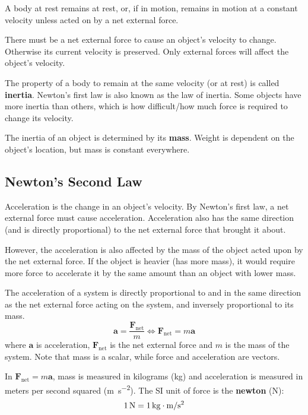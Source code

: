 \documentclass{article}
\newcommand{\theorem}[2]{\begin{tcolorbox}[title={#1},colback=blue!5!white,colframe=blue!75!black,parbox=false] #2 \end{tcolorbox}}
\begin{document}
\theorem{Newton's first law}{A body at rest remains at rest, or, if in motion, remains in motion at a constant velocity unless acted on by a net external force.}

There must be a net external force to cause an object's velocity to change. Otherwise its current velocity is preserved. Only external forces will affect the object's velocity.

The property of a body to remain at the same velocity (or at rest) is called \textbf{inertia}. Newton's first law is also known as the law of inertia. Some objects have more inertia than others, which is how difficult/how much force is required to change its velocity.

The inertia of an object is determined by its \textbf{mass}. Weight is dependent on the object's location, but mass is constant everywhere.

\subsection{Newton's Second Law}

Acceleration is the change in an object's velocity. By Newton's first law, a net external force must cause acceleration. Acceleration also has the same direction (and is directly proportional) to the net external force that brought it about.

However, the acceleration is also affected by the mass of the object acted upon by the net external force. If the object is heavier (has more mass), it would require more force to accelerate it by the same amount than an object with lower mass.

\theorem{Newton's second law}{The acceleration of a system is directly proportional to and in the same direction as the net external force acting on the system, and inversely proportional to its mass.
\begin{equation*}
	\mathbf{a}=\frac{\mathbf{F}_{\text{net}}}{m}
	\iff
	\mathbf{F}_{\text{net}}=m \mathbf{a}
\end{equation*}
where $\mathbf{a}$ is acceleration, $\mathbf{F}_{\text{net}}$ is the net external force and $m$ is the mass of the system. Note that mass is a scalar, while force and acceleration are vectors.}

In $\mathbf{F}_{\text{net}}=m \mathbf{a}$, mass is measured in kilograms (kg) and acceleration is measured in meters per second squared (\si{\meter\per\second\squared}). The SI unit of force is the \textbf{newton} (N):
\begin{equation*}
	1\,\si{\newton}=1\,\si[inter-unit-product =\cdot]{\kilo\gram\meter\per\second\squared}
\end{equation*}
\end{document}
